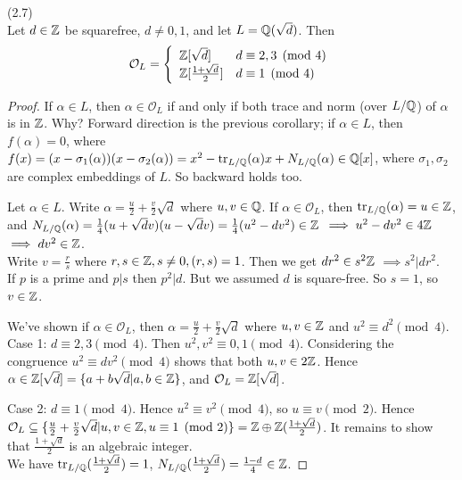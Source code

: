 \documentclass[a4paper]{article}
\begin{document}
\begin{prop} (2.7)\\
Let $d \in \mathbb{Z}$ be squarefree, $d \neq 0,1$, and let $L = \mathbb{Q}(\sqrt{d})$. Then 
\begin{equation*}
\begin{aligned}
\mathcal{O}_L = \left\{\begin{array}{ll}
\mathbb{Z}[\sqrt{d}] & d \equiv 2,3 \pmod 4\\
\mathbb{Z}[\frac{1+\sqrt{d}}{2}] & d \equiv 1 \pmod 4
\end{array}
\right.
\end{aligned}
\end{equation*}
\begin{proof}
If $\alpha \in L$, then $\alpha \in \mathcal{O}_L$ if and only if both trace and norm (over $L/\mathbb{Q}$) of $\alpha$ is in $\mathbb{Z}$. Why? Forward direction is the previous corollary; if $\alpha \in L$, then $f(\alpha) = 0$, where $f(x) = (x-\sigma_1(\alpha))(x-\sigma_2(\alpha)) = x^2 - \operatorname{tr}_{L/\mathbb{Q}}(\alpha)x+N_{L/\mathbb{Q}}(\alpha) \in \mathbb{Q}[x]$, where $\sigma_1,\sigma_2$ are complex embeddings of $L$. So backward holds too.

Let $\alpha \in L$. Write $\alpha = \frac{u}{2} + \frac{v}{2}\sqrt{d}$ where $u,v \in \mathbb{Q}$. If $\alpha \in \mathcal{O}_L$, then $\operatorname{tr}_{L/\mathbb{Q}}(\alpha) = u \in \mathbb{Z}$, and $N_{L/\mathbb{Q}}(\alpha) = \frac{1}{4} (u+\sqrt{d} v) (u-\sqrt{d} v) = \frac{1}{4} (u^2-dv^2) \in \mathbb{Z}$ $\implies u^2-dv^2 \in 4\mathbb{Z}$ $\implies dv^2\in\mathbb{Z}$.\\
Write $v=\frac{r}{s}$ where $r,s \in \mathbb{Z}, s \neq 0, (r,s) = 1$. Then we get $dr^2 \in s^2\mathbb{Z}$ $\implies s^2 | dr^2$.\\
If $p$ is a prime and $p|s$ then $p^2|d$. But we assumed $d$ is square-free. So $s=1$, so $v \in \mathbb{Z}$.

We've shown if $\alpha \in \mathcal{O}_L$, then $\alpha = \frac{u}{2} + \frac{v}{2}\sqrt{d}$ where $u,v \in \mathbb{Z}$ and $u^2 \equiv d^2 \pmod 4$.\\

Case 1: $d \equiv 2,3 \pmod 4$. Then $u^2,v^2 \equiv 0,1 \pmod 4$. Considering the congruence $u^2\equiv dv^2 \pmod 4$ shows that both $u,v \in 2\mathbb{Z}$. Hence $\alpha \in \mathbb{Z}[\sqrt{d}] = \{a+b\sqrt{d} | a,b \in \mathbb{Z}\}$, and $\mathcal{O}_L = \mathbb{Z}[\sqrt{d}]$.

Case 2: $d \equiv 1 \pmod 4$. Hence $u^2\equiv v^2 \pmod 4$, so $u \equiv v \pmod 2$. Hence $\mathcal{O}_L \subseteq \{\frac{u}{2}+\frac{v}{2}\sqrt{d} | u,v \in \mathbb{Z}, u \equiv 1 \pmod 2\} =\mathbb{Z} \oplus \mathbb{Z}(\frac{1+\sqrt{d}}{2})$. It remains to show that $\frac{1+\sqrt{d}}{2}$ is an algebraic integer.\\
We have $\operatorname{tr}_{L/\mathbb{Q}}(\frac{1+\sqrt{d}}{2}) = 1$, $N_{L/\mathbb{Q}}(\frac{1+\sqrt{d}}{2}) = \frac{1-d}{4} \in \mathbb{Z}$.
\end{proof}
\end{prop}
\end{document}
